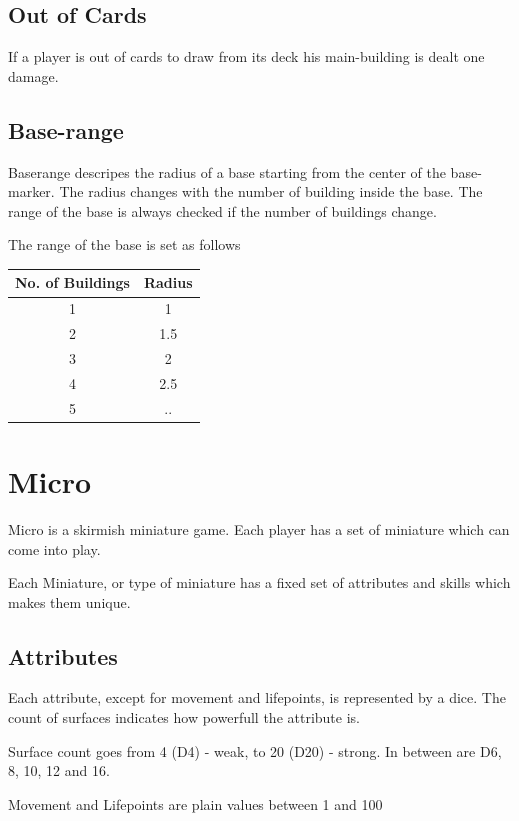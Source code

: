 \documentclass[a5paper,pagesize,10pt,bibtotoc,pointlessnumbers,
normalheadings,DIV=9,twoside=false]{scrbook}
\begin{document}
\section{Out of Cards}
If a player is out of cards to draw from its deck his main-building is dealt one damage.

\section{Base-range}
Baserange descripes the radius of a base starting from the center of the base-marker. The radius changes with the number of building inside the base.
The range of the base is always checked if the number of buildings change.

The range of the base is set as follows

\begin{center}
 \begin{tabular}{||c c||} 
 \hline
 No. of Buildings & Radius\\
 \hline\hline
 1 & 1 \\ 
 \hline
 2 & 1.5 \\
 \hline
 3 & 2 \\
 \hline
 4 & 2.5\\
 \hline
 5 & .. \\
 \hline
\end{tabular}
\end{center}


\chapter{Micro}

Micro is a skirmish miniature game. Each player has a set of miniature which can come into play.

Each Miniature, or type of miniature has a fixed set of attributes and skills which makes them unique.

\section{Attributes}
Each attribute, except for movement and lifepoints, is represented by a dice. The count of surfaces indicates how powerfull the attribute is.

Surface count goes from 4 (D4) - weak, to 20 (D20) - strong. In between are D6, 8, 10, 12 and 16.

Movement and Lifepoints are plain values between 1 and 100
\end{document}
